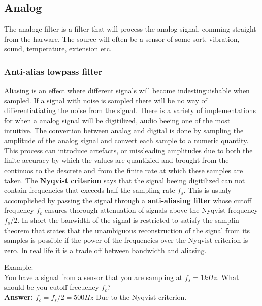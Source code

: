 \documentclass[12pt,a4paper]{article}
\begin{document}
  \subsection{Analog}
  The analoge filter is a filter that will process the analog signal,
  comming straight from the harware. The source will often be a sensor
  of some sort, vibration, sound, temperature, extension etc. 
  \subsubsection{Anti-alias lowpass filter}
  Aliasing is an effect where different signals will become
  indestinguishable when sampled. If a signal with noise is sampled
  there will be no way of differentiatiating the noise from the signal.
  There is a variety of implementations for when a analog signal will 
  be digitilized, audio beeing one of the most intuitive. The convertion
  between analog and digital is done by sampling the amplitude of the
  analog signal and convert each sample to a numeric quantity. This
  process can introduce artefacts, or missleading amplitudes due to both the
  finite accuracy by which the values are quantizied and brought from
  the continuos to the descrete and from the finite rate at which these
  samples are taken. The \textbf{Nyqvist criterion} says that the signal
  beeing digitilized can not contain frequencies that exceeds half the
  sampling rate $f_s$. This is usualy accomplished by passing the signal
  through a \textbf{anti-aliasing filter} whose cutoff frequency $f_c$
  ensures thorough attenuation of signals above the Nyqvist frequency
  $f_s/2$. In short the banwidth of the signal is restricted to satisfy
  the samplin theorem that states that the unambiguous reconstruction of
  the signal from its samples is possible if the power of the
  frequencies over the Nyqvist criterion is zero. In real life it is a
  trade off between bandwidth and aliasing. 
  \begin{exe}
    \ex Example: \\
    You have a signal from a sensor that you are sampling at $f_s = 1kHz$.
    What should be you cutoff frecuency $f_c$? \\
    \textbf{Answer:} $f_c = f_s/2 = 500 Hz$ Due to the Nyqvist criterion.
  \end{exe}
\end{document}
